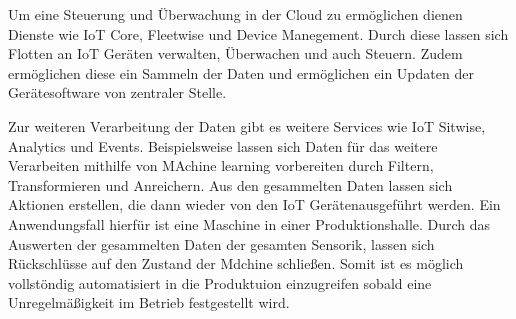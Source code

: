 Um eine Steuerung und Überwachung in der Cloud zu ermöglichen dienen Dienste wie IoT Core, Fleetwise und Device Manegement. Durch diese lassen sich Flotten an IoT Geräten verwalten, Überwachen und auch Steuern. Zudem ermöglichen diese ein Sammeln der Daten und ermöglichen ein Updaten der Gerätesoftware von zentraler Stelle.

Zur weiteren Verarbeitung der Daten gibt es weitere Services wie IoT Sitwise, Analytics und Events. Beispielsweise lassen sich Daten für das weitere Verarbeiten mithilfe von MAchine learning vorbereiten durch Filtern, Transformieren und Anreichern. Aus den gesammelten Daten lassen sich Aktionen erstellen, die dann wieder von den IoT Gerätenausgeführt werden. Ein Anwendungsfall hierfür ist eine Maschine in einer Produktionshalle. Durch das Auswerten der gesammelten Daten der gesamten Sensorik, lassen sich Rückschlüsse auf den Zustand der Mdchine schließen. Somit ist es möglich vollstöndig automatisiert in die Produktuion einzugreifen sobald eine Unregelmäßigkeit im Betrieb festgestellt wird.
